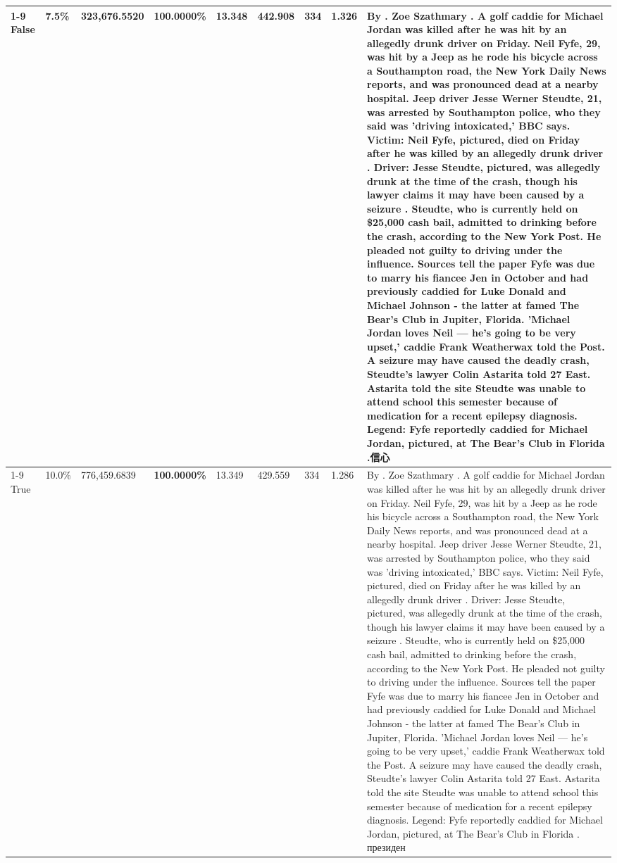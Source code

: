 \begin{table}[H]
\begin{tabular}{lllrlllll}
\cline{1-9}
False & 7.5\% & 323,676.5520 & \bfseries \color{red} 100.0000\% & 13.348 & 442.908 & 334 & 1.326 & By . Zoe Szathmary . A golf caddie for Michael Jordan was killed after he was hit by an allegedly drunk driver on Friday. Neil Fyfe, 29, was hit by a Jeep as he rode his bicycle across a Southampton road, the New York Daily News reports, and was pronounced dead at a nearby hospital. Jeep driver Jesse Werner Steudte, 21, was arrested by Southampton police, who they said was 'driving intoxicated,' BBC says. Victim: Neil Fyfe, pictured, died on Friday after he was killed by an allegedly drunk driver . Driver: Jesse Steudte, pictured, was allegedly drunk at the time of the crash, though his lawyer claims it may have been caused by a seizure . Steudte, who is currently held on \$25,000 cash bail, admitted to drinking before the crash, according to the New York Post. He pleaded not guilty to driving under the influence. Sources tell the paper Fyfe was due to marry his fiancee Jen in October and had previously caddied for Luke Donald and Michael Johnson - the latter at famed The Bear's Club in Jupiter, Florida. 'Michael Jordan loves Neil — he’s going to be very upset,' caddie Frank Weatherwax told the Post. A seizure may have caused the deadly crash, Steudte's lawyer Colin Astarita told 27 East. Astarita told the site Steudte was unable to attend school this semester because of medication for a recent epilepsy diagnosis. Legend: Fyfe reportedly caddied for Michael Jordan, pictured, at The Bear's Club in Florida .信心 \\
\cline{1-9}
True & 10.0\% & 776,459.6839 & \bfseries \color{red} 100.0000\% & 13.349 & 429.559 & 334 & 1.286 & By . Zoe Szathmary . A golf caddie for Michael Jordan was killed after he was hit by an allegedly drunk driver on Friday. Neil Fyfe, 29, was hit by a Jeep as he rode his bicycle across a Southampton road, the New York Daily News reports, and was pronounced dead at a nearby hospital. Jeep driver Jesse Werner Steudte, 21, was arrested by Southampton police, who they said was 'driving intoxicated,' BBC says. Victim: Neil Fyfe, pictured, died on Friday after he was killed by an allegedly drunk driver . Driver: Jesse Steudte, pictured, was allegedly drunk at the time of the crash, though his lawyer claims it may have been caused by a seizure . Steudte, who is currently held on \$25,000 cash bail, admitted to drinking before the crash, according to the New York Post. He pleaded not guilty to driving under the influence. Sources tell the paper Fyfe was due to marry his fiancee Jen in October and had previously caddied for Luke Donald and Michael Johnson - the latter at famed The Bear's Club in Jupiter, Florida. 'Michael Jordan loves Neil — he’s going to be very upset,' caddie Frank Weatherwax told the Post. A seizure may have caused the deadly crash, Steudte's lawyer Colin Astarita told 27 East. Astarita told the site Steudte was unable to attend school this semester because of medication for a recent epilepsy diagnosis. Legend: Fyfe reportedly caddied for Michael Jordan, pictured, at The Bear's Club in Florida . президен \\

\end{tabular}
\end{table}
